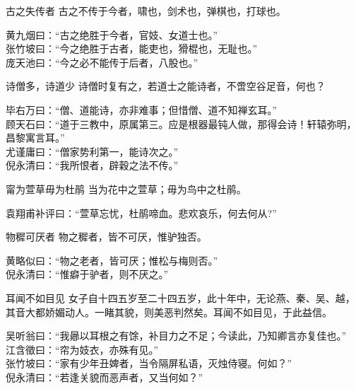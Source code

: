 \begin{yulu}{古之失传者}
古之不传于今者，啸也，剑术也，弹棋也，打球也。
\begin{comments}
黄九烟曰：“古之绝胜于今者，官妓、女道士也。” \\
张竹坡曰：“今之绝胜于古者，能吏也，猾棍也，无耻也。” \\
庞天池曰：“今之必不能传于后者，八股也。”
\end{comments}
\end{yulu}

\begin{yulu}{诗僧多，诗道少}
诗僧时复有之，若道士之能诗者，不啻空谷足音，何也？
\begin{comments}
毕右万曰：“僧、道能诗，亦非难事；但惜僧、道不知禅玄耳。” \\
顾天石曰：“道于三教中，原属第三。应是根器最钝人做，那得会诗！轩辕弥明，昌黎寓言耳。” \\
尤谨庸曰：“僧家势利第一，能诗次之。” \\
倪永清曰：“我所恨者，辟穀之法不传。”
\end{comments}
\end{yulu}

\begin{yulu}{甯为萱草毋为杜鹃}
当为花中之萱草；毋为鸟中之杜鹃。
\begin{comments}
袁翔甫补评曰：“萱草忘忧，杜鹃啼血。悲欢哀乐，何去何从?”
\end{comments}
\end{yulu}

\begin{yulu}{物穉可厌者}
物之穉者，皆不可厌，惟驴独否。
\begin{comments}
黄略似曰：“物之老者，皆可厌；惟松与梅则否。” \\
倪永清曰：“惟癖于驴者，则不厌之。”
\end{comments}
\end{yulu}

\begin{yulu}{耳闻不如目见}
女子自十四五岁至二十四五岁，此十年中，无论燕、秦、吴、越，其音大都娇媚动人。一睹其貌，则美恶判然矣。耳闻不如目见，于此益信。
\begin{comments}
吴听翁曰：“我曏以耳根之有馀，补目力之不足；今读此，乃知卿言亦复佳也。” \\
江含徵曰：“帘为妓衣，亦殊有见。” \\
张竹坡曰：“家有少年丑婢者，当令隔屏私语，灭烛侍寝。何如？” \\
倪永清曰：“若逢关貌而恶声者，又当何如？”
\end{comments}
\end{yulu}


